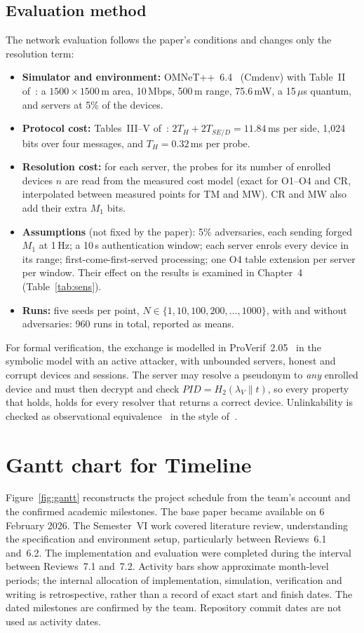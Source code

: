 \subsection*{Evaluation method}
The network evaluation follows the paper's conditions and changes only the resolution term:
\begin{itemize}
\item \textbf{Simulator and environment:} OMNeT++~6.4~\cite{omnet} (Cmdenv) with Table~II of~\cite{base}: a $1500\times1500$\,m area, 10\,Mbps, 500\,m range, 75.6\,mW, a 15\,$\mu$s quantum, and servers at 5\% of the devices.
\item \textbf{Protocol cost:} Tables~III--V of~\cite{base}: $2T_H+2T_{SE/D}=11.84$\,ms per side, 1,024 bits over four messages, and $T_H=0.32$\,ms per probe.
\item \textbf{Resolution cost:} for each server, the probes for its number of enrolled devices $n$ are read from the measured cost model (exact for O1--O4 and CR, interpolated between measured points for TM and MW). CR and MW also add their extra $M_1$ bits.
\item \textbf{Assumptions} (not fixed by the paper): 5\% adversaries, each sending forged $M_1$ at 1\,Hz; a 10\,s authentication window; each server enrols every device in its range; first-come-first-served processing; one O4 table extension per server per window. Their effect on the results is examined in Chapter~4 (Table~\ref{tab:sens}).
\item \textbf{Runs:} five seeds per point, $N\in\{1,10,100,200,\dots,1000\}$, with and without adversaries: 960 runs in total, reported as means.
\end{itemize}
For formal verification, the exchange is modelled in ProVerif~2.05~\cite{proverif} in the symbolic model with an active attacker, with unbounded servers, honest and corrupt devices and sessions. The server may resolve a pseudonym to \emph{any} enrolled device and must then decrypt and check $PID=H_2(\lambda_V\|t)$, so every property that holds, holds for every resolver that returns a correct device. Unlinkability is checked as observational equivalence~\cite{blanchet08} in the style of~\cite{arapinis}.

\section{Gantt chart for Timeline}\label{sec:gantt}
Figure~\ref{fig:gantt} reconstructs the project schedule from the team's account and the confirmed academic milestones. The base paper became available on 6 February 2026. The Semester~VI work covered literature review, understanding the specification and environment setup, particularly between Reviews~6.1 and~6.2. The implementation and evaluation were completed during the interval between Reviews~7.1 and~7.2. Activity bars show approximate month-level periods; the internal allocation of implementation, simulation, verification and writing is retrospective, rather than a record of exact start and finish dates. The dated milestones are confirmed by the team. Repository commit dates are not used as activity dates.

